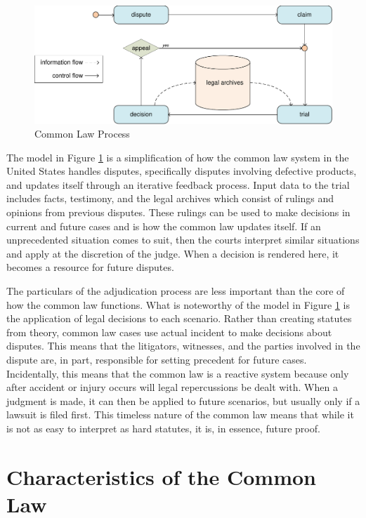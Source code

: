 \documentclass[12pt]{report}
\begin{document}
\begin{figure}[t]  
\begin{center}  
\includegraphics[scale=0.73]{figures/commonlaw.pdf}  
\end{center}  
\caption{Common Law Process}  
\label{fig:commonlaw}  
\end{figure}  

The model in Figure \ref{fig:commonlaw} is a simplification of how the common law system in the United States handles disputes, specifically disputes involving defective products, and updates itself through an iterative feedback process. Input data to the trial includes facts, testimony, and the legal archives which consist of rulings and opinions from previous disputes. These rulings can be used to make decisions in current and future cases and is how the common law updates itself. If an unprecedented situation comes to suit, then the courts interpret similar situations and apply at the discretion of the judge. When a decision is rendered here, it becomes a resource for future disputes. 

The particulars of the adjudication process are less important than the core of how the common law functions. What is noteworthy of the model in Figure \ref{fig:commonlaw} is the application of legal decisions to each scenario. Rather than creating statutes from theory, common law cases use actual incident to make decisions about disputes. This means that the litigators, witnesses, and the parties involved in the dispute are, in part, responsible for setting precedent for future cases. Incidentally, this means that the common law is a reactive system because only after accident or injury occurs will legal repercussions be dealt with. When a judgment is made, it can then be applied to future scenarios, but usually only if a lawsuit is filed first. This timeless nature of the common law means that while it is not as easy to interpret as hard statutes, it is, in essence, future proof. 

\section{Characteristics of the Common Law}  
\end{document}
